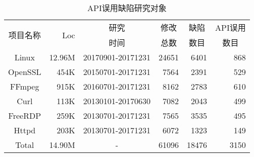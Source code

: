 \begin{table}[t]
	\centering
	\begin{minipage}[t]{0.9\linewidth} %
		\caption{API误用缺陷研究对象}
		\label{tab:2-3-statistics}
			\begin{tabular}{crcrrr}
			\hline
			\multirow{2}{*}{项目名称} & \multirow{2}{*}{Loc} & 研究 & \multicolumn{1}{c}{修改}& \multicolumn{1}{c}{缺陷}& \multicolumn{1}{c}{API误用}\\
			&  & 时间 & \multicolumn{1}{c}{总数} & \multicolumn{1}{c}{数目}& \multicolumn{1}{c}{数目} \\
			\hline
			Linux & 12.96M & 20170901-20171231 & 24651 & 6401 & 868 \\
			OpenSSL & 454K & 20150701-20171231 & 7564 & 2391 & 529 \\
			FFmpeg & 915K & 20160701-20171231 & 8162 & 2783 & 610 \\
			Curl & 113K & 20130101-20170630 & 7082 & 2043 & 499 \\
			FreeRDP & 259K & 20130701-20171231 & 7565 & 3535 & 495 \\
			Httpd & 203K & 20130701-20171231 & 6072 & 1323 & 149 \\
			\hline
			Total & 14.90M & - & 61096& 18476 & 3150 \\
			\hline
		\end{tabular}
	\end{minipage}
\end{table}